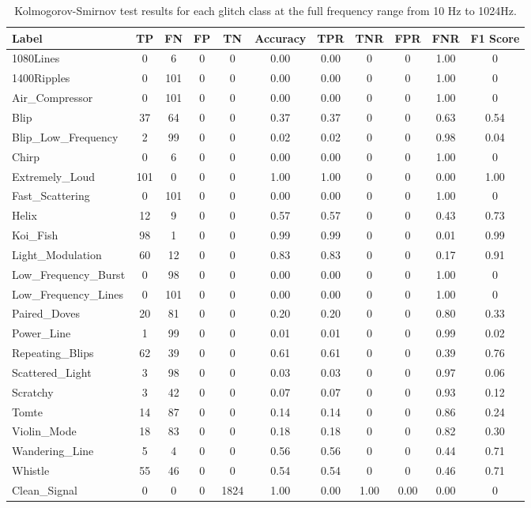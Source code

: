 \documentclass[12pt]{article}
\begin{document}
\begin{table}[H]
  \centering
  \begin{tabular}{lcccccccccc}
  \toprule
  Label & TP & FN & FP & TN & Accuracy & TPR & TNR & FPR & FNR & F1 Score \\
  \midrule
  1080Lines & 0 & 6 & 0 & 0 & 0.00 & 0.00 & 0 & 0 & 1.00 & 0 \\
  1400Ripples & 0 & 101 & 0 & 0 & 0.00 & 0.00 & 0 & 0 & 1.00 & 0 \\
  Air\_Compressor & 0 & 101 & 0 & 0 & 0.00 & 0.00 & 0 & 0 & 1.00 & 0 \\
  Blip & 37 & 64 & 0 & 0 & 0.37 & 0.37 & 0 & 0 & 0.63 & 0.54 \\
  Blip\_Low\_Frequency & 2 & 99 & 0 & 0 & 0.02 & 0.02 & 0 & 0 & 0.98 & 0.04 \\
  Chirp & 0 & 6 & 0 & 0 & 0.00 & 0.00 & 0 & 0 & 1.00 & 0 \\
  Extremely\_Loud & 101 & 0 & 0 & 0 & 1.00 & 1.00 & 0 & 0 & 0.00 & 1.00 \\
  Fast\_Scattering & 0 & 101 & 0 & 0 & 0.00 & 0.00 & 0 & 0 & 1.00 & 0 \\
  Helix & 12 & 9 & 0 & 0 & 0.57 & 0.57 & 0 & 0 & 0.43 & 0.73 \\
  Koi\_Fish & 98 & 1 & 0 & 0 & 0.99 & 0.99 & 0 & 0 & 0.01 & 0.99 \\
  Light\_Modulation & 60 & 12 & 0 & 0 & 0.83 & 0.83 & 0 & 0 & 0.17 & 0.91 \\
  Low\_Frequency\_Burst & 0 & 98 & 0 & 0 & 0.00 & 0.00 & 0 & 0 & 1.00 & 0 \\
  Low\_Frequency\_Lines & 0 & 101 & 0 & 0 & 0.00 & 0.00 & 0 & 0 & 1.00 & 0 \\
  Paired\_Doves & 20 & 81 & 0 & 0 & 0.20 & 0.20 & 0 & 0 & 0.80 & 0.33 \\
  Power\_Line & 1 & 99 & 0 & 0 & 0.01 & 0.01 & 0 & 0 & 0.99 & 0.02 \\
  Repeating\_Blips & 62 & 39 & 0 & 0 & 0.61 & 0.61 & 0 & 0 & 0.39 & 0.76 \\
  Scattered\_Light & 3 & 98 & 0 & 0 & 0.03 & 0.03 & 0 & 0 & 0.97 & 0.06 \\
  Scratchy & 3 & 42 & 0 & 0 & 0.07 & 0.07 & 0 & 0 & 0.93 & 0.12 \\
  Tomte & 14 & 87 & 0 & 0 & 0.14 & 0.14 & 0 & 0 & 0.86 & 0.24 \\
  Violin\_Mode & 18 & 83 & 0 & 0 & 0.18 & 0.18 & 0 & 0 & 0.82 & 0.30 \\
  Wandering\_Line & 5 & 4 & 0 & 0 & 0.56 & 0.56 & 0 & 0 & 0.44 & 0.71 \\
  Whistle & 55 & 46 & 0 & 0 & 0.54 & 0.54 & 0 & 0 & 0.46 & 0.71 \\
  Clean\_Signal & 0 & 0 & 0 & 1824 & 1.00 & 0.00 & 1.00 & 0.00 & 0.00 & 0 \\
  \bottomrule
  \end{tabular}
  \caption{Kolmogorov-Smirnov test results for each glitch class at the full frequency range from 10 Hz to 1024Hz.}
  \label{tab:ks_full_range_results}
\end{table}
\end{document}
